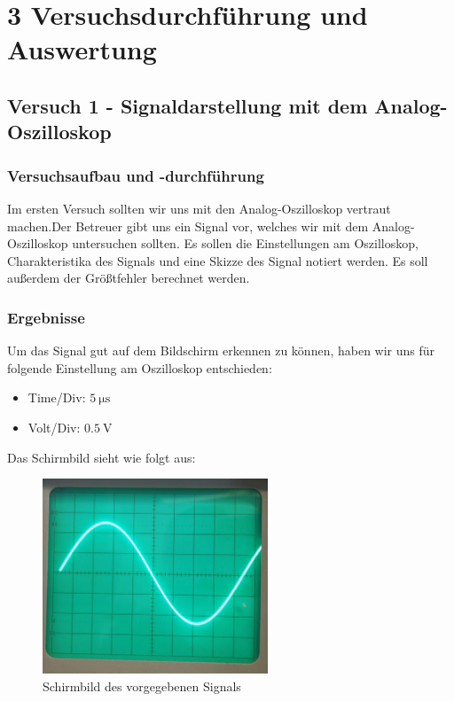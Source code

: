 \chapter*{3 Versuchsdurchführung und Auswertung}
\setcounter{chapter}{2}
\setcounter{section}{0}
\setcounter{subsection}{0}

\section{Versuch 1 - Signaldarstellung mit dem Analog-Oszilloskop}

    \subsection{Versuchsaufbau und -durchführung}
    
        Im ersten Versuch sollten wir uns mit den Analog-Oszilloskop vertraut machen.Der Betreuer gibt uns ein Signal vor, welches wir mit dem Analog-Oszilloskop untersuchen sollten. Es sollen die Einstellungen am Oszilloskop, Charakteristika des Signals und eine Skizze des Signal notiert werden. Es soll außerdem der Größtfehler berechnet werden.
        
    \subsection{Ergebnisse}

        Um das Signal gut auf dem Bildschirm erkennen zu können, haben wir uns für folgende Einstellung am Oszilloskop entschieden:
   
        \begin{itemize}
            \item Time/Div: $5\ \mathrm{\mu s}$
            \item Volt/Div: $0.5\ \mathrm{V}$
        \end{itemize}

        Das Schirmbild sieht wie folgt aus:

        \begin{figure}[H]
            \centering
            \includegraphics[width=0.6\textwidth]{bilder/Versuch_1.png}
            \caption{Schirmbild des vorgegebenen Signals}
            \label{fig:Versuch1_Schirmbild}
        \end{figure}

